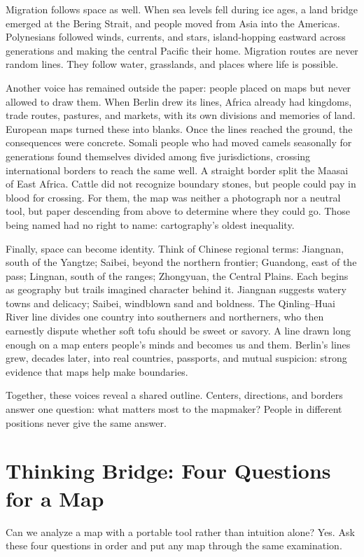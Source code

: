Migration follows space as well. When sea levels fell during ice ages, a land bridge emerged at the Bering Strait, and people moved from Asia into the Americas. Polynesians followed winds, currents, and stars, island-hopping eastward across generations and making the central Pacific their home. Migration routes are never random lines. They follow water, grasslands, and places where life is possible.

Another voice has remained outside the paper: people placed on maps but never allowed to draw them. When Berlin drew its lines, Africa already had kingdoms, trade routes, pastures, and markets, with its own divisions and memories of land. European maps turned these into blanks. Once the lines reached the ground, the consequences were concrete. Somali people who had moved camels seasonally for generations found themselves divided among five jurisdictions, crossing international borders to reach the same well. A straight border split the Maasai of East Africa. Cattle did not recognize boundary stones, but people could pay in blood for crossing. For them, the map was neither a photograph nor a neutral tool, but paper descending from above to determine where they could go. Those being named had no right to name: cartography's oldest inequality.

Finally, space can become identity. Think of Chinese regional terms: Jiangnan, south of the Yangtze; Saibei, beyond the northern frontier; Guandong, east of the pass; Lingnan, south of the ranges; Zhongyuan, the Central Plains. Each begins as geography but trails imagined character behind it. Jiangnan suggests watery towns and delicacy; Saibei, windblown sand and boldness. The Qinling--Huai River line divides one country into southerners and northerners, who then earnestly dispute whether soft tofu should be sweet or savory. A line drawn long enough on a map enters people's minds and becomes us and them. Berlin's lines grew, decades later, into real countries, passports, and mutual suspicion: strong evidence that maps help make boundaries.

Together, these voices reveal a shared outline. Centers, directions, and borders answer one question: what matters most to the mapmaker? People in different positions never give the same answer.

\section{Thinking Bridge: Four Questions for a Map}
Can we analyze a map with a portable tool rather than intuition alone? Yes. Ask these four questions in order and put any map through the same examination.

